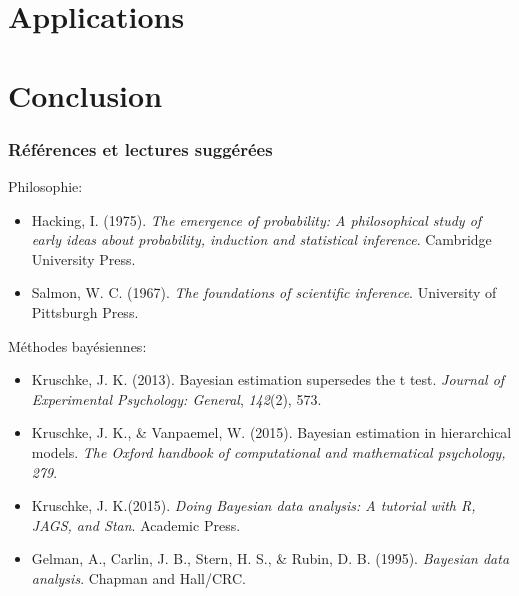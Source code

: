 \documentclass{beamer}
\begin{document}

\section{Applications}




\section{Conclusion}

\begin{frame}
    \frametitle{Références et lectures suggérées}

    Philosophie:
    \begin{itemize}
      \item Hacking, I. (1975). \emph{The emergence of probability:
            A philosophical study of early ideas about probability,
            induction and statistical inference}. Cambridge University Press.
      \item Salmon, W. C. (1967). \emph{The foundations of scientific inference}.
            University of Pittsburgh Press.
    \end{itemize}

    Méthodes bayésiennes:
    \begin{itemize}
      \item Kruschke, J. K. (2013). Bayesian estimation supersedes the t test.
            \emph{Journal of Experimental Psychology: General}, \emph{142}(2), 573.
      \item Kruschke, J. K., \& Vanpaemel, W. (2015). Bayesian estimation in hierarchical models.
            \emph{The Oxford handbook of computational and mathematical psychology, 279}.
      \item Kruschke, J. K.(2015). \emph{Doing Bayesian data analysis: A tutorial with R, JAGS, and Stan}.
            Academic Press.
      \item Gelman, A., Carlin, J. B., Stern, H. S., \& Rubin, D. B. (1995).
            \emph{Bayesian data analysis}. Chapman and Hall/CRC.
    \end{itemize}
\end{frame}


\end{document}

